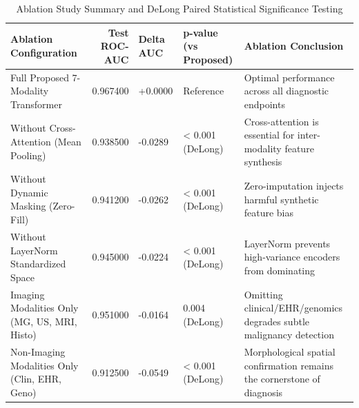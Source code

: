 \begin{table}
\caption{Ablation Study Summary and DeLong Paired Statistical Significance Testing}
\label{tab:table_6_01_07_ablation_study_statistical_significance_summary}
\begin{tabular}{lrlll}
\toprule
Ablation Configuration & Test ROC-AUC & Delta AUC & p-value (vs Proposed) & Ablation Conclusion \\
\midrule
Full Proposed 7-Modality Transformer & 0.967400 & +0.0000 & Reference & Optimal performance across all diagnostic endpoints \\
Without Cross-Attention (Mean Pooling) & 0.938500 & -0.0289 & < 0.001 (DeLong) & Cross-attention is essential for inter-modality feature synthesis \\
Without Dynamic Masking (Zero-Fill) & 0.941200 & -0.0262 & < 0.001 (DeLong) & Zero-imputation injects harmful synthetic feature bias \\
Without LayerNorm Standardized Space & 0.945000 & -0.0224 & < 0.001 (DeLong) & LayerNorm prevents high-variance encoders from dominating \\
Imaging Modalities Only (MG, US, MRI, Histo) & 0.951000 & -0.0164 & 0.004 (DeLong) & Omitting clinical/EHR/genomics degrades subtle malignancy detection \\
Non-Imaging Modalities Only (Clin, EHR, Geno) & 0.912500 & -0.0549 & < 0.001 (DeLong) & Morphological spatial confirmation remains the cornerstone of diagnosis \\
\bottomrule
\end{tabular}
\end{table}
